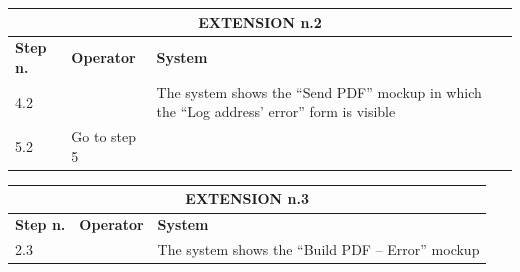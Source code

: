 {{{\begin{table}[h]
\begin{tabular}{|p{2cm}|p{6cm}|p{6cm}|}
				\multicolumn{3}{|c|}{EXTENSION n.2}\\
			\hline
				\centering \vspace{1mm} \bfseries{Step n.} \vspace{1mm} & \vspace{1mm} \bfseries{Operator} \vspace{1mm} & \vspace{1mm} \bfseries{System} \vspace{1mm}\\
			\hline
				\vspace{1mm} 4.2 \vspace{1mm} &
				\vspace{1mm} \vspace{1mm} & 
				\vspace{1mm} The system shows the “Send PDF” mockup in which the “Log address’ error” form is visible  \vspace{1mm} \\
			\hline
				\vspace{1mm} 5.2\vspace{1mm} &
				\vspace{1mm} Go to step 5\vspace{1mm} & 
				\vspace{1mm} \vspace{1mm} \\
			\hline
			\end{tabular}
			\end{table}
			\begin{table}[h]
			\begin{tabular}{|p{2cm}|p{6cm}|p{6cm}|}
			\hline
				\multicolumn{3}{|c|}{EXTENSION n.3}\\
			\hline
				\centering \vspace{1mm} \bfseries{Step n.} \vspace{1mm} & \vspace{1mm} \bfseries{Operator} \vspace{1mm} & \vspace{1mm} \bfseries{System} \vspace{1mm}\\
			\hline
				\vspace{1mm} 2.3\vspace{1mm} &
				\vspace{1mm} \vspace{1mm} & 
				\vspace{1mm} The system shows the “Build PDF – Error” mockup\vspace{1mm} \\

\end{tabular}
\end{table}}}}
